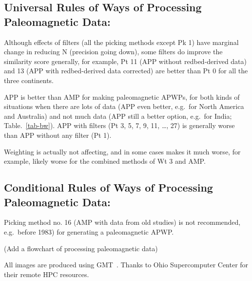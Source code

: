 \subsection{Universal Rules of Ways of Processing Paleomagnetic Data:}
%
\begin{description}
  \item Although effects of filters (all the picking methods except Pk 1) have
		marginal change in reducing N (precision going down), some filters do
		improve the similarity score generally, for example, Pt 11 (APP without
		redbed-derived data) and 13 (APP with redbed-derived data corrected) are
		better than Pt 0 for all the three continents.
  \item APP is better than AMP for making paleomagnetic APWPs, for both kinds
		of situations when there are lots of data (APP even better, e.g.\ for
		North America and Australia) and not much data (APP still a better
		option, e.g.\ for India; Table.~\ref{tab-bw}). APP with filters (Pt
		3, 5, 7, 9, 11, \ldots, 27) is generally worse than APP without any
		filter (Pt 1).
  \item Weighting is actually not affecting, and in some cases makes it much
		worse, for example, likely worse for the combined methods of Wt 3 and
		AMP.
\end{description}

\subsection{Conditional Rules of Ways of Processing Paleomagnetic Data:}
%
\begin{description}
  \item Picking method no. 16 (AMP with data from old studies) is not
		recommended, e.g.\ before 1983) for generating a paleomagnetic APWP.
\end{description}

(Add a flowchart of processing paleomagnetic data)

\begin{acknowledgments}
All images are produced using GMT~\cite{W13}. Thanks to Ohio Supercomputer
Center for their remote HPC resources.
\end{acknowledgments}

